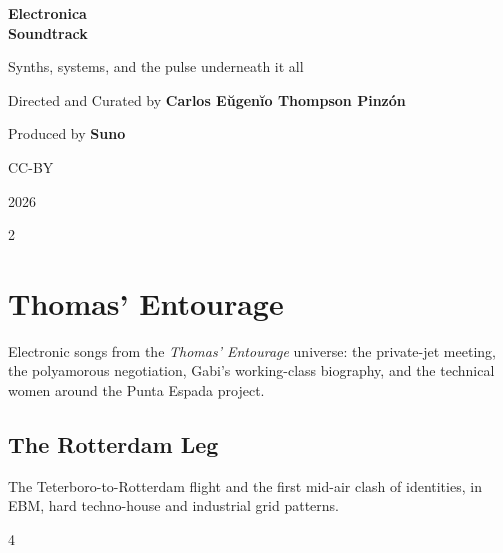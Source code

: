 \documentclass[a4paper,landscape]{memoir}
\begin{document}
\frontmatter
{}

\begin{titlingpage}
\centering
\vspace*{\fill}
{\LARGE\bfseries Electronica\\\Huge Soundtrack\par}
\bigskip
{\large Synths, systems, and the pulse underneath it all\par}
\vspace*{\fill}
{\normalsize Directed and Curated by \bfseries Carlos Eŭgenĭo Thompson Pinzón\par}
{\normalsize Produced by \bfseries Suno\par}
\bigskip
{\normalsize CC-BY\par}
{\normalsize 2026\par}
\vspace*{\fill}
\end{titlingpage}

\clearpage\begin{multicols*}{2}
\tableofcontents*
\end{multicols*}
\mainmatter
\renewcommand\chaptername{Album~}

\part{Thomas’ Entourage}
Electronic songs from the \emph{Thomas’ Entourage} universe: the private-jet meeting, the polyamorous negotiation, Gabi’s working-class biography, and the technical women around the Punta Espada project.

\chapter{The Rotterdam Leg}
The Teterboro-to-Rotterdam flight and the first mid-air clash of identities, in EBM, hard techno-house and industrial grid patterns.
\clearpage\begin{multicols*}{4}
\end{multicols*}
\end{document}
